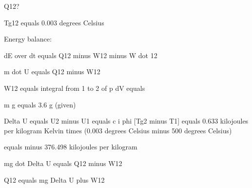 Q12?

Tg12 equals 0.003 degrees Celsius

Energy balance:

dE over dt equals Q12 minus W12 minus W dot 12

m dot U equals Q12 minus W12

W12 equals integral from 1 to 2 of p dV equals 

m g equals 3.6 g (given)

Delta U equals U2 minus U1 equals c i phi [Tg2 minus T1] equals 0.633 kilojoules per kilogram Kelvin times (0.003 degrees Celsius minus 500 degrees Celsius)

equals minus 376.498 kilojoules per kilogram

mg dot Delta U equals Q12 minus W12

Q12 equals mg Delta U plus W12